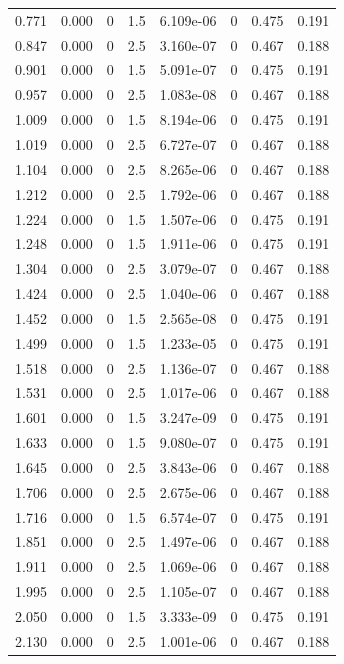 \documentclass[preview]{standalone}
\begin{document}
{{\begin{tabular}{L{1.2cm}C{1.2cm} C{0.3cm}C{0.5cm} C{1.4cm}C{1.4cm} C{1.4cm}C{1.4cm}}
  0.771  &  0.000  & 0     & 1.5 &  6.109e-06  & 0  & 0.475 &  0.191   \\ 
  0.847  &  0.000  & 0     & 2.5 &  3.160e-07  & 0  & 0.467 &  0.188   \\ 
  0.901  &  0.000  & 0     & 1.5 &  5.091e-07  & 0  & 0.475 &  0.191   \\ 
  0.957  &  0.000  & 0     & 2.5 &  1.083e-08  & 0  & 0.467 &  0.188   \\ 
  1.009  &  0.000  & 0     & 1.5 &  8.194e-06  & 0  & 0.475 &  0.191   \\ 
  1.019  &  0.000  & 0     & 2.5 &  6.727e-07  & 0  & 0.467 &  0.188   \\ 
  1.104  &  0.000  & 0     & 2.5 &  8.265e-06  & 0  & 0.467 &  0.188   \\ 
  1.212  &  0.000  & 0     & 2.5 &  1.792e-06  & 0  & 0.467 &  0.188   \\ 
  1.224  &  0.000  & 0     & 1.5 &  1.507e-06  & 0  & 0.475 &  0.191   \\ 
  1.248  &  0.000  & 0     & 1.5 &  1.911e-06  & 0  & 0.475 &  0.191   \\ 
  1.304  &  0.000  & 0     & 2.5 &  3.079e-07  & 0  & 0.467 &  0.188   \\ 
  1.424  &  0.000  & 0     & 2.5 &  1.040e-06  & 0  & 0.467 &  0.188   \\ 
  1.452  &  0.000  & 0     & 1.5 &  2.565e-08  & 0  & 0.475 &  0.191   \\ 
  1.499  &  0.000  & 0     & 1.5 &  1.233e-05  & 0  & 0.475 &  0.191   \\ 
  1.518  &  0.000  & 0     & 2.5 &  1.136e-07  & 0  & 0.467 &  0.188   \\ 
  1.531  &  0.000  & 0     & 2.5 &  1.017e-06  & 0  & 0.467 &  0.188   \\ 
  1.601  &  0.000  & 0     & 1.5 &  3.247e-09  & 0  & 0.475 &  0.191   \\ 
  1.633  &  0.000  & 0     & 1.5 &  9.080e-07  & 0  & 0.475 &  0.191   \\ 
  1.645  &  0.000  & 0     & 2.5 &  3.843e-06  & 0  & 0.467 &  0.188   \\ 
  1.706  &  0.000  & 0     & 2.5 &  2.675e-06  & 0  & 0.467 &  0.188   \\ 
  1.716  &  0.000  & 0     & 1.5 &  6.574e-07  & 0  & 0.475 &  0.191   \\ 
  1.851  &  0.000  & 0     & 2.5 &  1.497e-06  & 0  & 0.467 &  0.188   \\ 
  1.911  &  0.000  & 0     & 2.5 &  1.069e-06  & 0  & 0.467 &  0.188   \\ 
  1.995  &  0.000  & 0     & 2.5 &  1.105e-07  & 0  & 0.467 &  0.188   \\ 
  2.050  &  0.000  & 0     & 1.5 &  3.333e-09  & 0  & 0.475 &  0.191   \\ 
  2.130  &  0.000  & 0     & 2.5 &  1.001e-06  & 0  & 0.467 &  0.188   \\ 
\hline 
\end{tabular} 

}}
\end{document}
